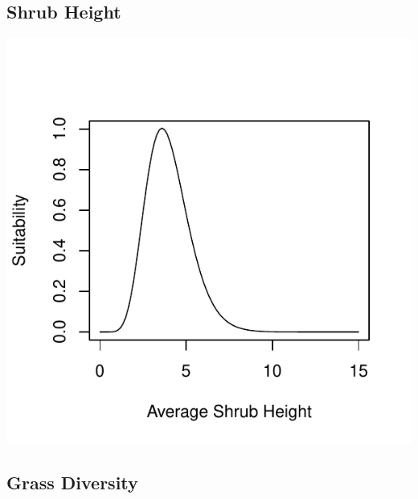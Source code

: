 \documentclass[12pt,letterpaper]{article}\usepackage{graphicx, color}
\makeatletter
\def\maxwidth{ %
  \ifdim\Gin@nat@width>\linewidth
    \linewidth
  \else
    \Gin@nat@width
  \fi
}
\newenvironment{knitrout}{}{} %
\makeatother
\begin{document}
\subsection{Shrub Height}
\begin{knitrout}
\color{fgcolor}\includegraphics[width=\maxwidth]{figure/Sally-Dan_Shrub_Height} 
\end{knitrout}

\subsection{Grass Diversity}
\end{document}
